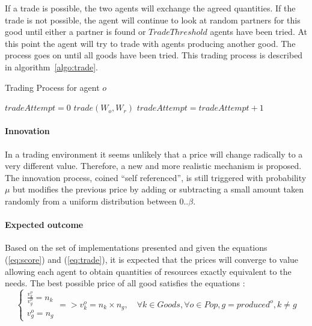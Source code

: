 \documentclass[a4paper]{article}
\begin{document}
If a trade is possible, the two agents will exchange the agreed quantities. If the trade is not possible, the agent will continue to look at random partners for this good until either a partner is found or $TradeThreshold$ agents have been tried. At this point the agent will try to trade with agents producing another good. The process goes on until all goods have been tried. This trading process is described in algorithm~\ref{algo:trade}.

\begin{algorithm}
\caption{Trading Process for agent $o$}
\label{algo:trade}
	\begin{algorithmic}[1]
			\State $tradeAttempt = 0$
					\State $trade(W_o,W_r)$
				\Else
					\State $tradeAttempt = tradeAttempt + 1$					
				\EndIf
			\EndFor
		\EndFor
\end{algorithmic}
\end{algorithm}


\paragraph{Innovation} In a trading environment it seems unlikely that a price will change radically to a very different value. Therefore, a new and more realistic mechanism is proposed. The innovation process, coined ``self referenced'', is still triggered with probability $\mu$ 
but modifies the previous price by adding or subtracting a small amount taken randomly from a uniform  distribution between $0 .. \beta$.


\paragraph{Expected outcome} Based on the set of implementations presented and given the equations (\ref{eq:score}) and (\ref{eq:trade}), it is expected that the prices will converge to value allowing each agent to obtain quantities of resources exactly equivalent to the needs. The best possible price of all good satisfies the equations :
\begin{equation}
	\begin{cases}
		\frac{v^o_k}{v^o_g} = n_k \\
		v^o_g = n_g 
	\end{cases} =>v^o_k = n_k \times n_g, \quad \forall k \in Goods, \forall o \in Pop, g = produced^o, k \not= g 
\end{equation}
\end{document}
